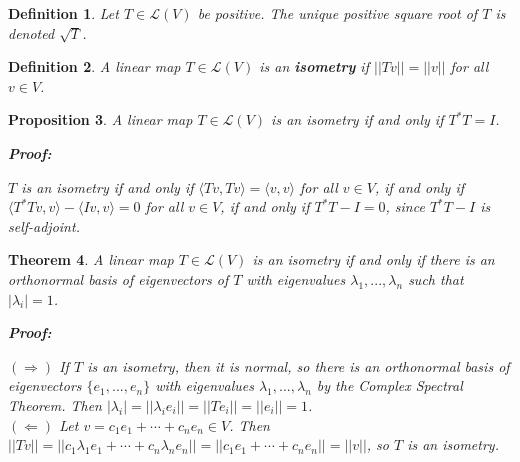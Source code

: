 \documentclass{article}
\theoremstyle{colontheorem}
\newtheorem{theorem}{Theorem}[section]
\newtheorem{proposition}[theorem]{Proposition}
\newtheorem{definition}[theorem]{Definition}
\newenvironment{Theorem}
{
	\begin{mdframed}[backgroundcolor=TheoremOrange!10]
	\begin{theorem}
}
{
	\end{theorem}
	\end{mdframed}
	
	\vspace{.15in}
}
\newenvironment{Proposition}
{
	\begin{mdframed}[backgroundcolor=TheoremOrange!10]
	\begin{proposition}
}
{
	\end{proposition}
	\end{mdframed}
	
	\vspace{.15in}
}
\newenvironment{Def}
{
	\begin{mdframed}[backgroundcolor=DefGreen!10]
	\begin{definition}
}
{
	\end{definition}
	\end{mdframed}
	
	\vspace{.15in}
}
\newenvironment{Proof}
{
	\begin{mdframed}[backgroundcolor=ProofPurple!10]
	\textbf{Proof:}%
}
{
	\end{mdframed}
	
	\vspace{.085in}
}
\begin{document}
\begin{Def}
	
	Let $T \in \mathcal{L}(V)$ be positive. The unique positive square root of $T$ is denoted $\sqrt{T}$.
	
\end{Def}



\begin{Def}
	
	A linear map $T \in \mathcal{L}(V)$ is an \textbf{isometry} if $||Tv|| = ||v||$ for all $v \in V$.
	
\end{Def}



\begin{Proposition}
	
	A linear map $T \in \mathcal{L}(V)$ is an isometry if and only if $T^* T = I$.
	
	\begin{Proof}
		$T$ is an isometry if and only if $\langle Tv, Tv \rangle = \langle v, v \rangle$ for all $v \in V$, if and only if $\langle T^* T v, v \rangle - \langle Iv, v \rangle = 0$ for all $v \in V$, if and only if $T^* T - I = 0$, since $T^* T - I$ is self-adjoint.
		
	\end{Proof}
	
\end{Proposition}



\begin{Theorem}
	
	A linear map $T \in \mathcal{L}(V)$ is an isometry if and only if there is an orthonormal basis of eigenvectors of $T$ with eigenvalues $\lambda_1, ..., \lambda_n$ such that $|\lambda_i| = 1$.
	
	\begin{Proof}
		$(\Rightarrow)$ If $T$ is an isometry, then it is normal, so there is an orthonormal basis of eigenvectors $\{e_1, ..., e_n\}$ with eigenvalues $\lambda_1, ..., \lambda_n$ by the Complex Spectral Theorem. Then $|\lambda_i| = ||\lambda_i e_i|| = ||Te_i|| = ||e_i|| = 1$.\\
		
		$(\Leftarrow)$ Let $v = c_1 e_1 + \cdots + c_n e_n \in V$. Then $||Tv|| = ||c_1 \lambda_1 e_1 + \cdots + c_n \lambda_n e_n|| = ||c_1 e_1 + \cdots + c_n e_n|| = ||v||$, so $T$ is an isometry.
		
	\end{Proof}
	
\end{Theorem}
\end{document}
